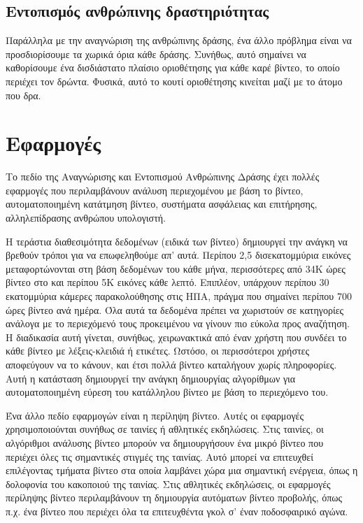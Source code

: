 \subsection{Εντοπισμός ανθρώπινης δραστηριότητας}
Παράλληλα με την αναγνώριση της ανθρώπινης δράσης, ένα άλλο πρόβλημα είναι να προσδιορίσουμε τα χωρικά όρια κάθε δράσης. Συνήθως, αυτό σημαίνει
να καθορίσουμε  ένα δισδιάστατο πλαίσιο οριοθέτησης για κάθε καρέ βίντεο, το οποίο περιέχει τον δρώντα. Φυσικά, αυτό το κουτί οριοθέτησης κινείται μαζί με
το άτομο που δρα.

\section{Εφαρμογές}
Το πεδίο της Αναγνώρισης και Εντοπισμού Ανθρώπινης Δράσης  έχει πολλές εφαρμογές που περιλαμβάνουν
  ανάλυση περιεχομένου με βάση το βίντεο, αυτοματοποιημένη κατάτμηση βίντεο, συστήματα ασφάλειας και επιτήρησης,
αλληλεπίδρασης ανθρώπου υπολογιστή. \par
Η τεράστια διαθεσιμότητα δεδομένων (ειδικά των βίντεο) δημιουργεί την ανάγκη να βρεθούν τρόποι για να επωφεληθούμε απ' αυτά.
Περίπου 2,5 δισεκατομμύρια εικόνες μεταφορτώνονται στη βάση δεδομένων του  κάθε μήνα, περισσότερες από 34K ώρες βίντεο στο  και 
περίπου 5K εικόνες κάθε λεπτό. Επιπλέον, υπάρχουν περίπου 30 εκατομμύρια κάμερες παρακολούθησης στις ΗΠΑ, πράγμα που σημαίνει
περίπου 700 ώρες βίντεο ανά ημέρα. Όλα αυτά τα δεδομένα πρέπει να χωριστούν σε κατηγορίες ανάλογα με το περιεχόμενό τους
προκειμένου να γίνουν πιο εύκολα προς αναζήτηση. Η διαδικασία αυτή γίνεται, συνήθως, χειρωνακτικά από έναν χρήστη που συνδέει το κάθε βίντεο με 
λέξεις-κλειδιά ή ετικέτες. Ωστόσο, οι περισσότεροι χρήστες αποφεύγουν να το κάνουν, και έτσι πολλά βίντεο καταλήγουν χωρίς πληροφορίες.
Αυτή η κατάσταση δημιουργεί την ανάγκη δημιουργίας αλγορίθμων για αυτοματοποιημένη εύρεση του κατάλληλου βίντεο με βάση το περιεχόμενο του.

Ένα άλλο πεδίο εφαρμογών είναι η περίληψη βίντεο. Αυτές οι εφαρμογές χρησιμοποιούνται συνήθως σε ταινίες ή αθλητικές εκδηλώσεις. Στις ταινίες,
οι αλγόριθμοι ανάλυσης βίντεο μπορούν να δημιουργήσουν ένα μικρό βίντεο που περιέχει όλες τις σημαντικές στιγμές της ταινίας. Αυτό
μπορεί να επιτευχθεί επιλέγοντας τμήματα βίντεο στα οποία λαμβάνει χώρα μια σημαντική ενέργεια, όπως η δολοφονία του κακοποιού
της ταινίας. Στις αθλητικές εκδηλώσεις, οι εφαρμογές περίληψης βίντεο  περιλαμβάνουν τη δημιουργία αυτόματων βίντεο προβολής, όπως π.χ.
ένα βίντεο που περιέχει όλα τα επιτευχθέντα γκολ σ' έναν ποδοσφαιρικό αγώνα.

